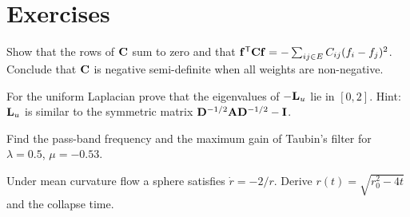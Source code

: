 \section*{Exercises}
\begin{exercise}
Show that the rows of $\mathbf{C}$ sum to zero and that $\mathbf{f}^{\mathsf{T}}\mathbf{C}\mathbf{f}=-\sum_{ij\in E}C_{ij}(f_i-f_j)^2$.
Conclude that $\mathbf{C}$ is negative semi-definite when all weights are non-negative.
\end{exercise}
\begin{exercise}
For the uniform Laplacian prove that the eigenvalues of $-\mathbf{L}_u$ lie in $[0,2]$. Hint: $\mathbf{L}_u$ is
similar to the symmetric matrix $\mathbf{D}^{-1/2}\mathbf{A}\mathbf{D}^{-1/2}-\mathbf{I}$.
\end{exercise}
\begin{exercise}
Find the pass-band frequency and the maximum gain of Taubin's filter for $\lambda=0.5$,
$\mu=-0.53$.
\end{exercise}
\begin{exercise}
Under mean curvature flow a sphere satisfies $\dot r=-2/r$. Derive $r(t)=\sqrt{r_0^2-4t}$ and the
collapse time.
\end{exercise}
